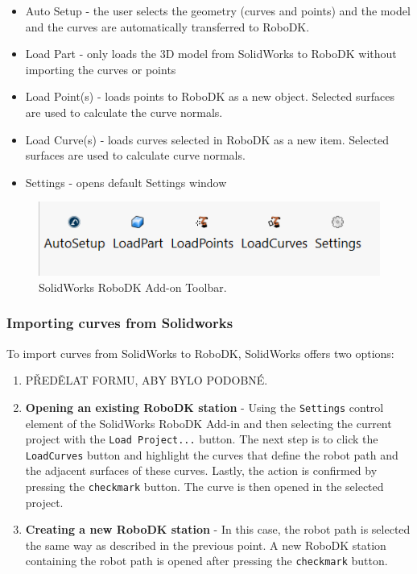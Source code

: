 \begin{itemize}
    \item Auto Setup - the user selects the geometry (curves and points) and the model and the curves are automatically transferred to RoboDK.
    \item Load Part - only loads the 3D model from SolidWorks to RoboDK without importing the curves or points
    \item Load Point(s) - loads points to RoboDK as a new object. Selected surfaces are used to calculate the curve normals. 
    \item Load Curve(s) -  loads curves selected in RoboDK as a new item. Selected surfaces are used to calculate curve normals. 
    \item Settings - opens default Settings window
\end{itemize}

\begin{figure}[h]
    \centering
    \includegraphics[width=0.6\linewidth]{img/solidworks_toolbar.PNG}
    \caption{SolidWorks RoboDK Add-on Toolbar.}
    \label{fig:solidworkstoolbar}
\end{figure}


\subsubsection*{Importing curves from Solidworks}

To import curves from SolidWorks to RoboDK, SolidWorks offers two options:

\begin{enumerate}

\item PŘEDĚLAT FORMU, ABY BYLO PODOBNÉ.

\item \textbf{Opening an existing RoboDK station} - Using the \texttt{Settings} control element of the SolidWorks RoboDK Add-in and then selecting the current project with the \texttt{Load Project...} button. The next step is to click the \texttt{LoadCurves} button and highlight the curves that define the robot path and the adjacent surfaces of these curves. Lastly, the action is confirmed by pressing the \texttt{checkmark} button. The curve is then opened in the selected project. 

\item \textbf{Creating a new RoboDK station} - In this case, the robot path is selected the same way as described in the previous point. A new RoboDK station containing the robot path is opened after pressing the \texttt{checkmark} button.

\end{enumerate}


